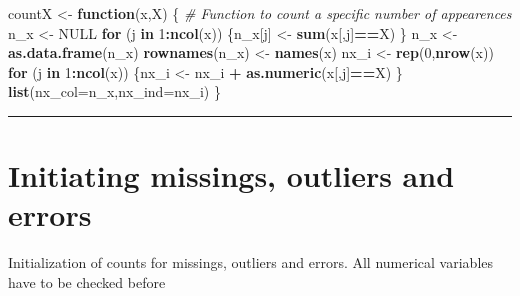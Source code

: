 \documentclass[
  18pt,
  a4paper]{article}
\newenvironment{Shaded}{\begin{snugshade}}{\end{snugshade}}
\newcommand{\CommentTok}[1]{\textcolor[rgb]{0.56,0.35,0.01}{\textit{#1}}}
\newcommand{\ControlFlowTok}[1]{\textcolor[rgb]{0.13,0.29,0.53}{\textbf{#1}}}
\newcommand{\DataTypeTok}[1]{\textcolor[rgb]{0.13,0.29,0.53}{#1}}
\newcommand{\DecValTok}[1]{\textcolor[rgb]{0.00,0.00,0.81}{#1}}
\newcommand{\KeywordTok}[1]{\textcolor[rgb]{0.13,0.29,0.53}{\textbf{#1}}}
\newcommand{\NormalTok}[1]{#1}
\newcommand{\OperatorTok}[1]{\textcolor[rgb]{0.81,0.36,0.00}{\textbf{#1}}}
\newcommand{\OtherTok}[1]{\textcolor[rgb]{0.56,0.35,0.01}{#1}}
\newcommand{\StringTok}[1]{\textcolor[rgb]{0.31,0.60,0.02}{#1}}
\begin{document}
\begin{Shaded}
\begin{Highlighting}[]
\NormalTok{countX <-}\StringTok{ }\ControlFlowTok{function}\NormalTok{(x,X) \{ }\CommentTok{# Function to count a specific number of appearences}
\NormalTok{  n_x <-}\StringTok{ }\OtherTok{NULL}
  \ControlFlowTok{for}\NormalTok{ (j }\ControlFlowTok{in} \DecValTok{1}\OperatorTok{:}\KeywordTok{ncol}\NormalTok{(x)) \{n_x[j] <-}\StringTok{ }\KeywordTok{sum}\NormalTok{(x[,j]}\OperatorTok{==}\NormalTok{X) \}}
\NormalTok{  n_x <-}\StringTok{ }\KeywordTok{as.data.frame}\NormalTok{(n_x)}
  \KeywordTok{rownames}\NormalTok{(n_x) <-}\StringTok{ }\KeywordTok{names}\NormalTok{(x)}
\NormalTok{  nx_i <-}\StringTok{ }\KeywordTok{rep}\NormalTok{(}\DecValTok{0}\NormalTok{,}\KeywordTok{nrow}\NormalTok{(x))}
  \ControlFlowTok{for}\NormalTok{ (j }\ControlFlowTok{in} \DecValTok{1}\OperatorTok{:}\KeywordTok{ncol}\NormalTok{(x)) \{nx_i <-}\StringTok{ }\NormalTok{nx_i }\OperatorTok{+}\StringTok{ }\KeywordTok{as.numeric}\NormalTok{(x[,j]}\OperatorTok{==}\NormalTok{X) \}}
  \KeywordTok{list}\NormalTok{(}\DataTypeTok{nx_col=}\NormalTok{n_x,}\DataTypeTok{nx_ind=}\NormalTok{nx_i) }
\NormalTok{\}}
\end{Highlighting}
\end{Shaded}

\begin{center}\rule{0.5\linewidth}{0.5pt}\end{center}

\hypertarget{initiating-missings-outliers-and-errors}{%
\section{Initiating missings, outliers and
errors}\label{initiating-missings-outliers-and-errors}}

Initialization of counts for missings, outliers and errors. All
numerical variables have to be checked before
\end{document}
